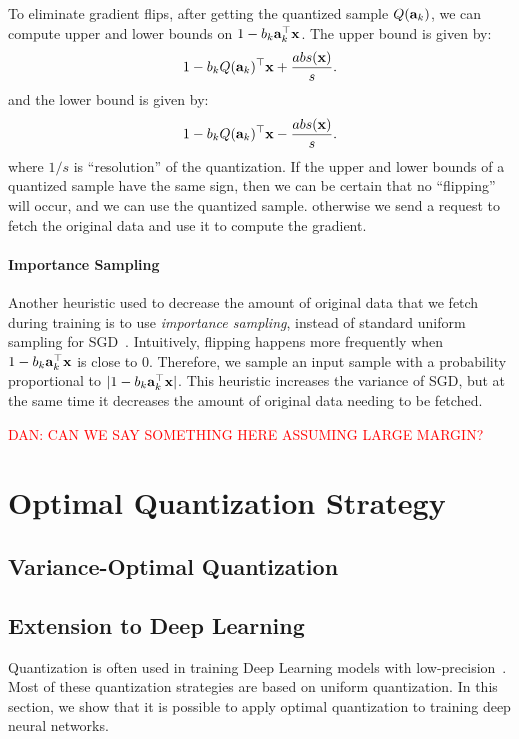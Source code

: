 \documentclass{article}
\def\a{{\bf a}}
\def\x{{\bf x}}
\begin{document}
To eliminate gradient flips, after getting the quantized sample $Q(\a_k)$, we can compute  upper and lower bounds on $1 - b_k \a_k^\top \x$. 
The upper bound is given by:
\[1 - b_k Q(\a_k)^\top \x + {abs(\x)\over s}.
\]
and the lower bound is given by:
\[1 - b_k Q(\a_k)^\top \x - {abs(\x)\over s}.
\]
where $1/s$ is ``resolution'' of the quantization. If the upper and lower bounds of a quantized sample have the same sign, then we can be certain that  no ``flipping'' will occur, and we can use the quantized sample. otherwise we send a request to fetch the original data and use it to  compute the gradient.

\paragraph*{Importance Sampling}  Another heuristic used to decrease the amount of original data that
we fetch during training is to use {\em importance sampling}, instead of standard uniform sampling for SGD~\cite{ImportantSampling}. Intuitively, flipping happens more frequently when $1 - b_k \a_k^\top \x$ is close to 0.
Therefore, we sample an input sample with a probability proportional to $|1 - b_k \a_k^\top \x|$. This heuristic 
increases the variance of SGD, but at the same time it decreases the amount of original data
needing to be fetched. 

\textcolor{red}{DAN: CAN WE SAY SOMETHING HERE ASSUMING LARGE MARGIN?}


\section{Optimal Quantization Strategy}

\subsection{Variance-Optimal Quantization}



\subsection{Extension to Deep Learning}

Quantization is often used in training 
Deep Learning models with low-precision~\cite{XXX,XXX}.
Most of these quantization strategies
are based on uniform quantization. In this
section, we show that it is possible to
apply optimal quantization to
training deep neural networks.
\end{document}
